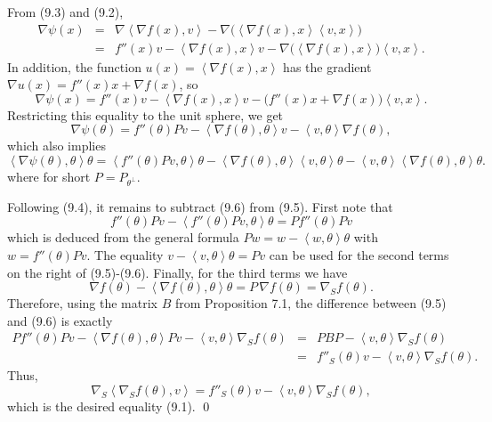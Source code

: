 \documentclass[reqno,12pt]{amsart}
\theoremstyle{plain}
\begin{document}
From (9.3) and (9.2),
\begin{eqnarray*}
\nabla \psi(x)
 & = &
\nabla \left<\nabla f(x),v\right> - 
\nabla \big(\left<\nabla f(x),x\right> \left<v,x\right>\big) \\
 & = &
f''(x)v - \left<\nabla f(x),x\right> v -
\nabla \big(\left<\nabla f(x),x\right>\big) \left<v,x\right>.
\end{eqnarray*}
In addition, the function $u(x) = \left<\nabla f(x),x\right>$ has the 
gradient $\nabla u(x) = f''(x)x + \nabla f(x)$, so
$$
\nabla \psi(x) = f''(x)v - \left<\nabla f(x),x\right> v -
\big(f''(x)x + \nabla f(x)\big) \left<v,x\right>.
$$
Restricting this equality to the unit sphere, we get
\begin{equation}
\nabla \psi(\theta) = f''(\theta) Pv - 
\left<\nabla f(\theta),\theta\right> v -
\left<v,\theta\right> \nabla f(\theta),
\end{equation}
which also implies
\begin{equation}
\left<\nabla \psi(\theta),\theta\right>\theta = 
\left<f''(\theta) Pv,\theta\right>\theta - 
\left<\nabla f(\theta),\theta\right> \left<v,\theta\right>\theta -
\left<v,\theta\right> \left<\nabla f(\theta),\theta\right>\theta.
\end{equation}
where for short $P = P_{\theta^\perp}$.

Following (9.4), it remains to subtract (9.6) from (9.5). 
First note that
$$
f''(\theta) Pv - \left<f''(\theta) Pv,\theta\right>\theta = P f''(\theta) Pv
$$
which is deduced from the general formula
$Pw = w - \left<w,\theta\right>\theta$ with $w = f''(\theta) Pv$.
The equality $v - \left<v,\theta\right>\theta = Pv$ can be used for the 
second terms on the right of (9.5)-(9.6). Finally, for
the third terms we have
$$
\nabla f(\theta) - \left<\nabla f(\theta),\theta\right>\theta = 
P\,\nabla f(\theta) = \nabla_S f(\theta).
$$
Therefore, using the matrix $B$ from Proposition 7.1, the difference between 
(9.5) and (9.6) is exactly
\begin{eqnarray*}
P f''(\theta) Pv - \left<\nabla f(\theta),\theta\right> Pv  - 
\left<v,\theta\right> \nabla_S f(\theta)
 & = &
PBP - \left<v,\theta\right> \nabla_S f(\theta) \\
 & = &
f''_S(\theta) v - \left<v,\theta\right> \nabla_S f(\theta).
\end{eqnarray*}
Thus,
\begin{equation}
\nabla_S \left<\nabla_S f(\theta),v\right> = 
f''_S(\theta) v - \left<v,\theta\right> \nabla_S f(\theta),
\end{equation}
which is the desired equality (9.1).
\qed
\end{document}
